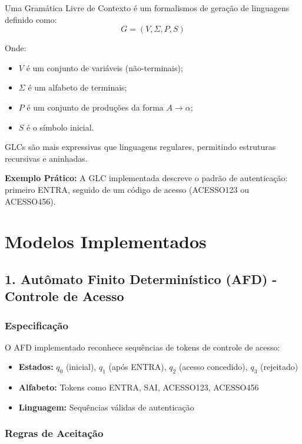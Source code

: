 \documentclass[12pt,a4paper]{article}
\begin{document}
Uma Gramática Livre de Contexto é um formalismos de geração de linguagens definido como:
\[ G = (V, \Sigma, P, S) \]

Onde:
\begin{itemize}
    \item $V$ é um conjunto de variáveis (não-terminais);
    \item $\Sigma$ é um alfabeto de terminais;
    \item $P$ é um conjunto de produções da forma $A \rightarrow \alpha$;
    \item $S$ é o símbolo inicial.
\end{itemize}

GLCs são mais expressivas que linguagens regulares, permitindo estruturas recursivas e aninhadas.

\textbf{Exemplo Prático:} A GLC implementada descreve o padrão de autenticação: primeiro ENTRA, seguido de um código de acesso (ACESSO123 ou ACESSO456).

\newpage

\section{Modelos Implementados}

\subsection{1. Autômato Finito Determinístico (AFD) - Controle de Acesso}

\subsubsection{Especificação}

O AFD implementado reconhece sequências de tokens de controle de acesso:
\begin{itemize}
    \item \textbf{Estados:} $q_0$ (inicial), $q_1$ (após ENTRA), $q_2$ (acesso concedido), $q_3$ (rejeitado)
    \item \textbf{Alfabeto:} Tokens como ENTRA, SAI, ACESSO123, ACESSO456
    \item \textbf{Linguagem:} Sequências válidas de autenticação
\end{itemize}

\subsubsection{Regras de Aceitação}
\end{document}
